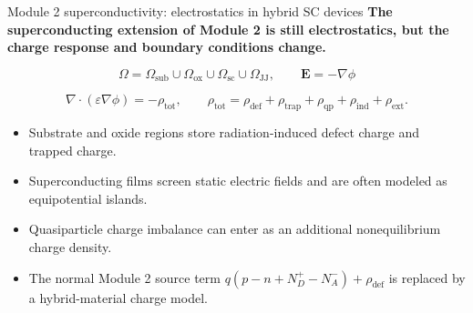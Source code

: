 \documentclass[aspectratio=169,10pt]{beamer}
\begin{document}
\begin{frame}{Module 2 superconductivity: electrostatics in hybrid SC devices}
\small
\textbf{The superconducting extension of Module 2 is still electrostatics, but the charge response and boundary conditions change.}

\vspace{0.2em}
\begin{equation*}
\boxed{
\Omega=\Omega_{\mathrm{sub}}\cup\Omega_{\mathrm{ox}}\cup\Omega_{\mathrm{sc}}\cup\Omega_{\mathrm{JJ}},
\qquad
\mathbf E=-\nabla\phi
}
\end{equation*}

\vspace{-0.2em}
\begin{equation*}
\nabla\cdot(\varepsilon\nabla\phi)
=-\rho_{\mathrm{tot}},
\qquad
\rho_{\mathrm{tot}}
=\rho_{\mathrm{def}}+\rho_{\mathrm{trap}}+\rho_{\mathrm{qp}}+\rho_{\mathrm{ind}}+\rho_{\mathrm{ext}}.
\end{equation*}

\vspace{-0.2em}
\begin{itemize}
    \item Substrate and oxide regions store radiation-induced defect charge and trapped charge.
    \item Superconducting films screen static electric fields and are often modeled as equipotential islands.
    \item Quasiparticle charge imbalance can enter as an additional nonequilibrium charge density.
    \item The normal Module 2 source term $q(p-n+N_D^+-N_A^-)+\rho_{\mathrm{def}}$ is replaced by a hybrid-material charge model.
\end{itemize}
\end{frame}
\end{document}
